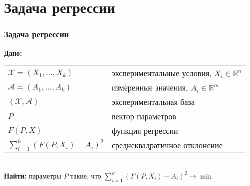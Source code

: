 \documentclass[24pt,pdf,hyperref={unicode}]{beamer}
\begin{document}
\section{Задача регрессии}

\begin{frame}\frametitle{Задача регрессии}
{\bf Дано:}
\begin{tabular}{p{4cm} p{6cm}}
 $\mathcal{X}=(X_1,\ldots,X_k)$ & экспериментальные условия, $X_i\in\mathbb{R}^n$\\[0.1cm]
 $\mathcal{A}=(A_1,\ldots,A_k)$ & измеренные значения, $A_i\in\mathbb{R}^m$\\[0.1cm]
 $(\mathcal{X},\mathcal{A})$ & экспериментальная база \\[0.1cm]
 $P$ & вектор параметров \\[0.1cm]
 $F(P,X)$ & функция регрессии \\[0.1cm]
 $\sum_{i=1}^{k} (F(P,X_i)-A_i)^2 $ & среднеквадратичное отклонение\\
 \end{tabular}\\[1cm]
 {\bf Найти:}
 параметры $P$ такие, что $\sum_{i=1}^{k} (F(P,X_i)-A_i)^2 \rightarrow \min$
\end{frame}
\end{document}
